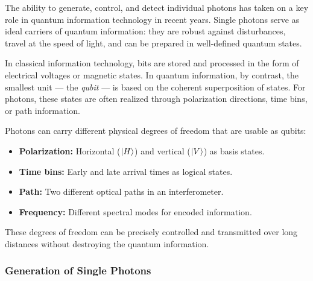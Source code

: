 The ability to generate, control, and detect individual photons has taken on a key role in quantum information technology in recent years. Single photons serve as ideal carriers of quantum information: they are robust against disturbances, travel at the speed of light, and can be prepared in well-defined quantum states.

In classical information technology, bits are stored and processed in the form of electrical voltages or magnetic states. In quantum information, by contrast, the smallest unit — the \emph{qubit} — is based on the coherent superposition of states. For photons, these states are often realized through polarization directions, time bins, or path information.
\vspace{1em}
\begin{tcolorbox}[physikbox, title=What Makes a Photon an Information Carrier? \label{box:photon_information}]
	\small
	Photons can carry different physical degrees of freedom that are usable as qubits:
	\begin{itemize}
		\item \textbf{Polarization:} Horizontal ($\ket{H}$) and vertical ($\ket{V}$) as basis states.
		\item \textbf{Time bins:} Early and late arrival times as logical states.
		\item \textbf{Path:} Two different optical paths in an interferometer.
		\item \textbf{Frequency:} Different spectral modes for encoded information.
	\end{itemize}
	These degrees of freedom can be precisely controlled and transmitted over long distances without destroying the quantum information.
\end{tcolorbox}

\subsubsection{Generation of Single Photons}

